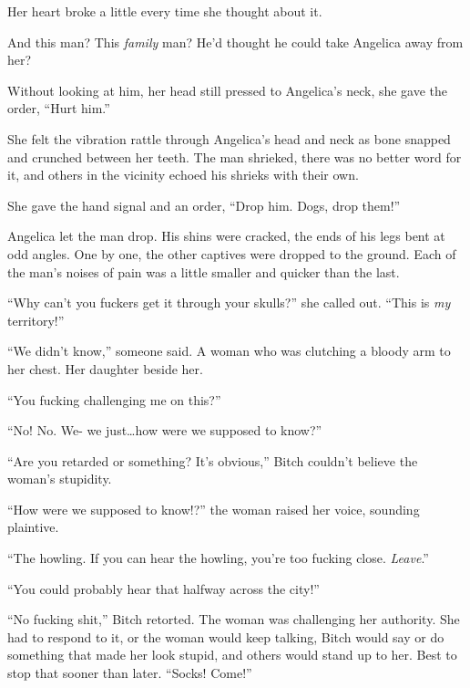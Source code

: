 Her heart broke a little every time she thought about it.



And this man?  This \emph{family} man?  He'd thought he could take Angelica away from her?



Without looking at him, her head still pressed to Angelica's neck, she gave the order, ``Hurt him.''



She felt the vibration rattle through Angelica's head and neck as bone snapped and crunched between her teeth.  The man shrieked, there was no better word for it, and others in the vicinity echoed his shrieks with their own.



She gave the hand signal and an order, ``Drop him.  Dogs, drop them!''



Angelica let the man drop.  His shins were cracked, the ends of his legs bent at odd angles.  One by one, the other captives were dropped to the ground.  Each of the man's noises of pain was a little smaller and quicker than the last.



``Why can't you fuckers get it through your skulls?'' she called out.  ``This is \emph{my} territory!''



``We didn't know,'' someone said.  A woman who was clutching a bloody arm to her chest. Her daughter beside her.



``You fucking challenging me on this?''



``No!  No.  We- we just\ldots how were we supposed to know?''



``Are you retarded or something?  It's obvious,'' Bitch couldn't believe the woman's stupidity.



``How were we supposed to know!?'' the woman raised her voice, sounding plaintive.



``The howling.  If you can hear the howling, you're too fucking close.  \emph{Leave}.''



``You could probably hear that halfway across the city!''



``No fucking shit,'' Bitch retorted.  The woman was challenging her authority.  She had to respond to it, or the woman would keep talking, Bitch would say or do something that made her look stupid, and others would stand up to her.  Best to stop that sooner than later.  ``Socks!  Come!''



